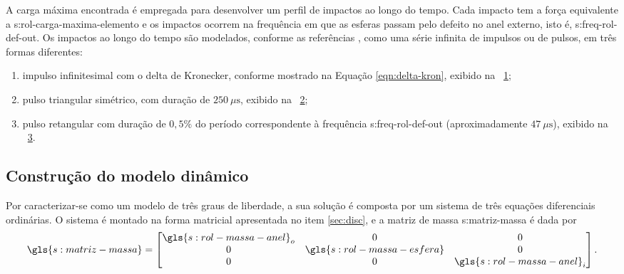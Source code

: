 \documentclass[12pt,oneside,english,brazil,lmodern,siglas,simbolos,cite=num]{ucsmonograph}
\begin{document}
	A carga máxima encontrada é empregada para desenvolver um perfil de impactos ao longo do tempo.
	Cada impacto tem a força equivalente a \gls{s:rol-carga-maxima-elemento} e os impactos ocorrem na frequência em que as esferas passam pelo defeito no anel externo, isto é, \gls{s:freq-rol-def-out}.
	Os impactos ao longo do tempo são modelados, conforme as referências \cite{mcfadden:1984,tandon:1997}, como uma série infinita de impulsos ou de pulsos, em três formas diferentes:
	\begin{enumerate}
		\item impulso infinitesimal com o delta de Kronecker, conforme mostrado na Equação \ref{eqn:delta-kron}, exibido na \figurename\ \ref{fig:modelo-imp-kron};
		\item pulso triangular simétrico, com duração de $250\ \mu\text{s}$, exibido na \figurename\ \ref{fig:modelo-imp-tri};
		\item pulso retangular com duração de $0,5\%$ do período correspondente à frequência \gls{s:freq-rol-def-out} (aproximadamente $47\ \mu\text{s}$), exibido na \figurename\ \ref{fig:modelo-imp-rect}.
	\end{enumerate}
	
	\begin{figure}[b]
		\label{fig:modelo-imp-kron}
	\end{figure}
	
	\begin{figure}[ht]
		\label{fig:modelo-imp-tri}
	\end{figure}

	\begin{figure}[ht]
		\label{fig:modelo-imp-rect}
	\end{figure}

	\subsection{Construção do modelo dinâmico}
	Por caracterizar-se como um modelo de três graus de liberdade, a sua solução é composta por um sistema de três equações diferenciais ordinárias.
	O sistema é montado na forma matricial apresentada no item \ref{sec:disc}, e a matriz de massa \gls{s:matriz-massa} é dada por
	\begin{equation*}
		\gls{s:matriz-massa} =
	\begin{bmatrix}
		\gls{s:rol-massa-anel}_o	&	0	&	0\\
		0	&	\gls{s:rol-massa-esfera}	&	0\\
		0	&	0	&	\gls{s:rol-massa-anel}_i
	\end{bmatrix}.
	\end{equation*}
	
\end{document}
